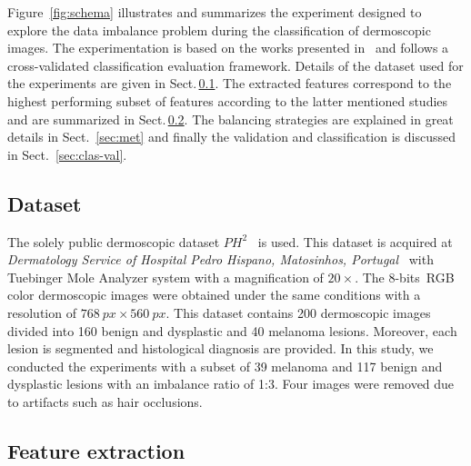 \noindent Figure~\ref{fig:schema} illustrates and summarizes the experiment designed to explore the data imbalance problem during the classification of dermoscopic images.
The experimentation is based on the works presented in~\cite{rastgoo2015automatic, rastgoo2015ensemble} and follows a cross-validated classification evaluation framework.
Details of the dataset used for the experiments are given in Sect.\,\ref{sec:dataset}. 
The extracted features correspond to the highest performing subset of features according to the latter mentioned studies and are summarized in Sect.\,\ref{sec:feat}.
The balancing strategies are explained in great details in Sect. \,\ref{sec:met} and finally the validation and classification is discussed in Sect. \,\ref{sec:clas-val}.

\subsection{Dataset}\label{sec:dataset}
The solely public dermoscopic dataset $PH^{2}$~\cite{barata2013two} is used.   
This dataset is acquired at \textit{Dermatology Service of Hospital Pedro Hispano, Matosinhos, Portugal}~\cite{barata2013two} with Tuebinger Mole Analyzer system with a magnification of $20 \times$.
The 8-bits~RGB color dermoscopic images were obtained under the same conditions with a resolution of $\SI{768}{px} \times \SI{560}{px}$. 
This dataset contains 200 dermoscopic images divided into 160 benign and dysplastic and 40 melanoma lesions. Moreover, each lesion is segmented and histological diagnosis are provided. 
In this study, we conducted the experiments with a subset of 39 melanoma and 117 benign and dysplastic lesions with an imbalance ratio of 1:3. Four images were removed due to artifacts such as hair occlusions. 

\subsection{Feature extraction}\label{sec:feat}

